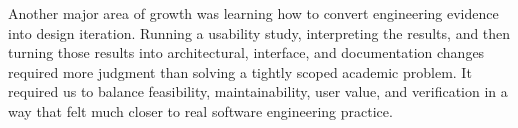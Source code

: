 \documentclass{article}
\begin{document}
Another major area of growth was learning how to convert engineering
evidence into design iteration. Running a usability study,
interpreting the results, and then turning those results into
architectural, interface, and documentation changes required more
judgment than solving a tightly scoped academic problem. It required us
to balance feasibility, maintainability, user value, and verification in
a way that felt much closer to real software engineering practice.



\end{document}
